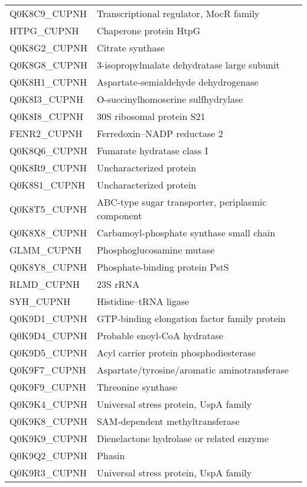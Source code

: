 \begin{center}
\begin{longtable}{ l l }
Q0K8C9\_CUPNH & Transcriptional regulator, MocR family \\ [0.5ex]
HTPG\_CUPNH & Chaperone protein HtpG \\ [0.5ex]
Q0K8G2\_CUPNH & Citrate synthase \\ [0.5ex]
Q0K8G8\_CUPNH & 3-isopropylmalate dehydratase large subunit \\ [0.5ex]
Q0K8H1\_CUPNH & Aspartate-semialdehyde dehydrogenase \\ [0.5ex]
Q0K8I3\_CUPNH & O-succinylhomoserine sulfhydrylase \\ [0.5ex]
Q0K8I8\_CUPNH & 30S ribosomal protein S21 \\ [0.5ex]
FENR2\_CUPNH & Ferredoxin--NADP reductase 2 \\ [0.5ex]
Q0K8Q6\_CUPNH & Fumarate hydratase class I \\ [0.5ex]
Q0K8R9\_CUPNH & Uncharacterized protein \\ [0.5ex]
Q0K8S1\_CUPNH & Uncharacterized protein \\ [0.5ex]
Q0K8T5\_CUPNH & ABC-type sugar transporter, periplasmic component \\ [0.5ex]
Q0K8X8\_CUPNH & Carbamoyl-phosphate synthase small chain \\ [0.5ex]
GLMM\_CUPNH & Phosphoglucosamine mutase \\ [0.5ex]
Q0K8Y8\_CUPNH & Phosphate-binding protein PstS \\ [0.5ex]
RLMD\_CUPNH & 23S rRNA \\ [0.5ex]
SYH\_CUPNH & Histidine--tRNA ligase \\ [0.5ex]
Q0K9D1\_CUPNH & GTP-binding elongation factor family protein \\ [0.5ex]
Q0K9D4\_CUPNH & Probable enoyl-CoA hydratase \\ [0.5ex]
Q0K9D5\_CUPNH & Acyl carrier protein phosphodiesterase \\ [0.5ex]
Q0K9F7\_CUPNH & Aspartate/tyrosine/aromatic aminotransferase \\ [0.5ex]
Q0K9F9\_CUPNH & Threonine synthase \\ [0.5ex]
Q0K9K4\_CUPNH & Universal stress protein, UspA family \\ [0.5ex]
Q0K9K8\_CUPNH & SAM-dependent methyltransferase \\ [0.5ex]
Q0K9K9\_CUPNH & Dienelactone hydrolase or related enzyme \\ [0.5ex]
Q0K9Q2\_CUPNH & Phasin \\ [0.5ex]
Q0K9R3\_CUPNH & Universal stress protein, UspA family \\ [0.5ex]

\end{longtable}
\end{center}
